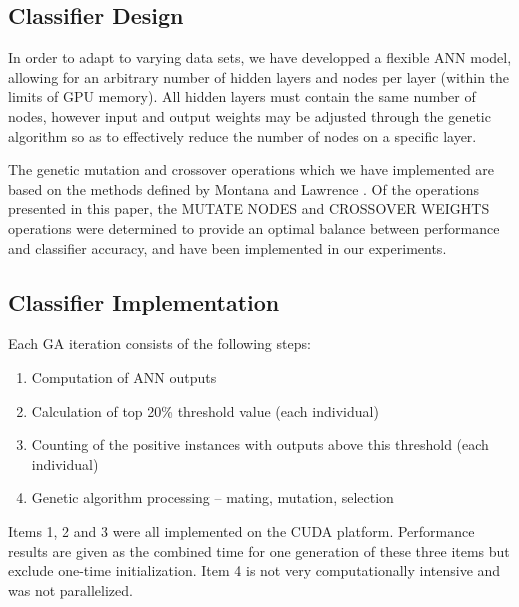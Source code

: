 \documentclass[11pt]{article}       %
\begin{document}
\subsection{Classifier Design} \label{design}
In order to adapt to varying data sets, we have developped a flexible ANN model, allowing for an arbitrary number of hidden layers and nodes per layer (within the limits of GPU memory). All hidden layers must contain the same number of nodes, however input and output weights may be adjusted through the genetic algorithm so as to effectively reduce the number of nodes on a specific layer.

The genetic mutation and crossover operations which we have implemented are based on the methods defined by Montana and Lawrence \cite{GA-ANN}. Of the operations presented in this paper, the MUTATE NODES and CROSSOVER WEIGHTS operations were determined to provide an optimal balance between performance and classifier accuracy, and have been implemented in our experiments.

\subsection{Classifier Implementation} \label{implementation}
Each GA iteration consists of the following steps:
\begin{enumerate}
	\item Computation of ANN outputs
	\item Calculation of top 20\% threshold value (each individual)
	\item Counting of the positive instances with outputs above this threshold (each individual)
	\item Genetic algorithm processing -- mating, mutation, selection
\end{enumerate}

Items 1, 2 and 3 were all implemented on the CUDA platform. Performance results are given as the combined time for one generation of these three items but exclude one-time initialization. Item 4 is not very computationally intensive and was not parallelized. 

\end{document}
